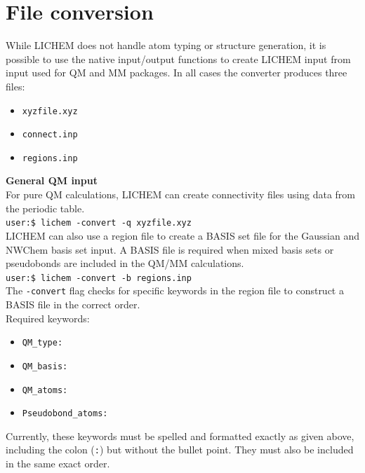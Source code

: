 \documentclass[12pt]{report}
\begin{document}
\section{File conversion}

While LICHEM does not handle atom typing or structure generation, it is
possible to use the native input/output functions to create LICHEM input from
input used for QM and MM packages.
In all cases the converter produces three files:
\begin{itemize}
\item \texttt{xyzfile.xyz} 
\item \texttt{connect.inp}
\item \texttt{regions.inp}\\
\end{itemize}

{\textbf{General QM input}} \\

For pure QM calculations, LICHEM can create connectivity files using data
from the periodic table. \\

\texttt{user:\$ lichem -convert -q xyzfile.xyz} \\

LICHEM can also use a region file to create a BASIS set file for the Gaussian
and NWChem basis set input.
A BASIS file is required when mixed basis sets or pseudobonds are included
in the QM/MM calculations. \\

\texttt{user:\$ lichem -convert -b regions.inp} \\

The \texttt{-convert} flag checks for specific keywords in the region file to
construct a BASIS file in the correct order. \\

Required keywords:
\begin{itemize}
\item \texttt{QM\_type:}
\item \texttt{QM\_basis:}
\item \texttt{QM\_atoms:}
\item \texttt{Pseudobond\_atoms:}\\
\end{itemize}

Currently, these keywords must be spelled and formatted exactly as given
above, including the colon (\texttt{:}) but without the bullet point. 
They must also be included in the same exact order. \\
\end{document}
